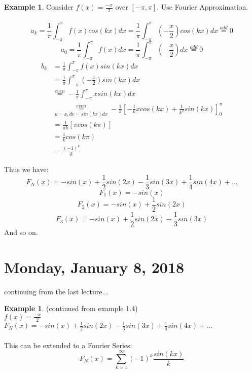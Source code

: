 \documentclass[12pt]{article}
\theoremstyle{plain}
\theoremstyle{definition}
\newtheorem{example}[theorem]{Example}
\begin{document}
\begin{example}
	Consider $f(x)=\frac{-x}{2}$ over $[-\pi, \pi]$. Use Fourier Approximation.\\
	\\
	$$a_k = \frac{1}{\pi} \int^{\pi}_{-\pi} f(x) cos(kx) dx = \frac{1}{\pi} \int^{\pi}_{-\pi} (-\frac{x}{2}) cos(kx) dx \overset{odd}{=} 0$$
	$$a_0 = \frac{1}{\pi} \int^{\pi}_{-\pi} f(x) dx = \frac{1}{\pi} \int^{\pi}_{-\pi} (-\frac{x}{2}) dx \overset{odd}{=} 0$$
	\begin{align*}
		b_k &= \frac{1}{\pi} \int^{\pi}_{-\pi} f(x) sin(kx) dx\\
		&= \frac{1}{\pi} \int^{\pi}_{-\pi} (-\frac{x}{2}) sin(kx) dx\\
		&\overset{even}{=} - \frac{1}{\pi} \int^{\pi}_{-\pi}  x sin(kx) dx\\
		&\underset{u=x, dv=sin(kx)dx}{\overset{even}{=}} - \frac{1}{\pi} [-\frac{1}{k} x cos(kx) + \frac{1}{k^2} sin(kx)]^\pi_0\\
		&= \frac{1}{\pi k} [\pi cos(k\pi)]\\
		&= \frac{1}{k} cos(k\pi)\\
		&= \frac{(-1)^k}{k}
	\end{align*}

	Thus we have:
	$$F_N (x) = -sin(x) + \frac{1}{2}sin(2x) - \frac{1}{3}sin(3x) + \frac{1}{4}sin(4x) + ...$$
	$$F_1 (x) = -sin(x)$$
	$$F_2 (x) = -sin(x) + \frac{1}{2}sin(2x)$$
	$$F_3 (x) = -sin(x) + \frac{1}{2}sin(2x) - \frac{1}{3}sin(3x)$$
	$$...$$
	And so on.

\end{example}

\newpage

\section{Monday, January 8, 2018}

continuing from the last lecture...

\begin{example}
    (continued from example 1.4)\\
    $f(x) = \frac{-x}{2}$\\
    $F_N (x) = -sin(x) + \frac{1}{2}sin(2x) - \frac{1}{3}sin(3x) + \frac{1}{4}sin(4x) + ...$\\
    \\
    This can be extended to a Fourier Series:
    $$F_N (x) = \sum^\infty_{k=1} (-1)^k \frac{sin(kx)}{k}$$
\end{example}
\end{document}
